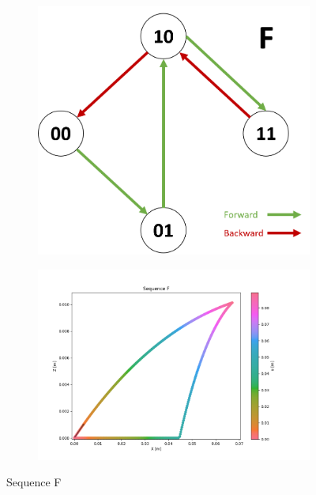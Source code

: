         \begin{figure}[h]
            \begin{subfigure}{.3\textwidth}
            \includegraphics[width=\textwidth]{images/S_F.png}
            \end{subfigure}%
            \begin{subfigure}{.7\textwidth}
            \includegraphics[width=\textwidth]{images/F.png}
            \end{subfigure}
            \caption{Sequence F}
        \end{figure}
